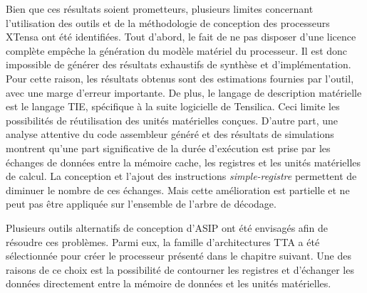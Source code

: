 Bien que ces résultats soient prometteurs, plusieurs limites concernant l'utilisation des outils et de la méthodologie de conception des processeurs XTensa ont été identifiées. Tout d'abord, le fait de ne pas disposer d'une licence complète empêche la génération du modèle matériel du processeur. Il est donc impossible de générer des résultats exhaustifs de synthèse et d'implémentation. Pour cette raison, les résultats obtenus sont des estimations fournies par l'outil, avec une marge d'erreur importante. De plus, le langage de description matérielle est le langage TIE, spécifique à la suite logicielle de Tensilica. Ceci limite les possibilités de réutilisation des unités matérielles conçues. D'autre part, une analyse attentive du code assembleur généré et des résultats de simulations montrent qu'une part significative de la durée d'exécution est prise par les échanges de données entre la mémoire cache, les registres et les unités matérielles de calcul. La conception et l'ajout des instructions \textit{simple-registre} permettent de diminuer le nombre de ces échanges. Mais cette amélioration est partielle et ne peut pas être appliquée sur l'ensemble de l'arbre de décodage.

Plusieurs outils alternatifs de conception d'ASIP ont été envisagés afin de résoudre ces problèmes. Parmi eux, la famille d'architectures \og TTA \fg a été sélectionnée pour créer le processeur présenté dans le chapitre suivant. Une des raisons de ce choix est la possibilité de contourner les registres et d'échanger les données directement entre la mémoire de données et les unités matérielles.